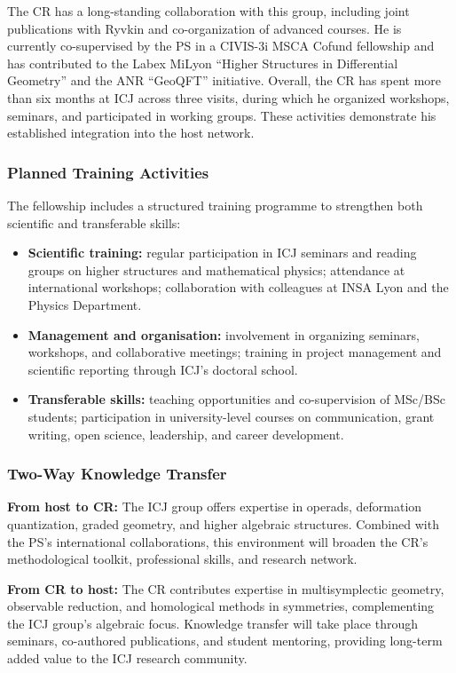 \documentclass[11pt]{msca-pf}
\begin{document}
The CR has a long-standing collaboration with this group, including joint publications with Ryvkin and co-organization of advanced courses. He is currently co-supervised by the PS in a CIVIS-3i MSCA Cofund fellowship and has contributed to the Labex MiLyon “Higher Structures in Differential Geometry” and the ANR “GeoQFT” initiative. Overall, the CR has spent more than six months at ICJ across three visits, during which he organized workshops, seminars, and participated in working groups. These activities demonstrate his established integration into the host network.

\subsubsection*{Planned Training Activities}
The fellowship includes a structured training programme to strengthen both scientific and transferable skills:
\begin{itemize}[noitemsep,topsep=0pt]
    \item \textbf{Scientific training:} regular participation in ICJ seminars and reading groups on higher structures and mathematical physics; attendance at international workshops; collaboration with colleagues at INSA Lyon and the Physics Department.
    \item \textbf{Management and organisation:} involvement in organizing seminars, workshops, and collaborative meetings; training in project management and scientific reporting through ICJ’s doctoral school.
    \item \textbf{Transferable skills:} teaching opportunities and co-supervision of MSc/BSc students; participation in university-level courses on communication, grant writing, open science, leadership, and career development.
\end{itemize}

\subsubsection*{Two-Way Knowledge Transfer}
\textbf{From host to CR:} The ICJ group offers expertise in operads, deformation quantization, graded geometry, and higher algebraic structures. Combined with the PS’s international collaborations, this environment will broaden the CR’s methodological toolkit, professional skills, and research network.

\textbf{From CR to host:} The CR contributes expertise in multisymplectic geometry, observable reduction, and homological methods in symmetries, complementing the ICJ group’s algebraic focus. Knowledge transfer will take place through seminars, co-authored publications, and student mentoring, providing long-term added value to the ICJ research community.
\end{document}
